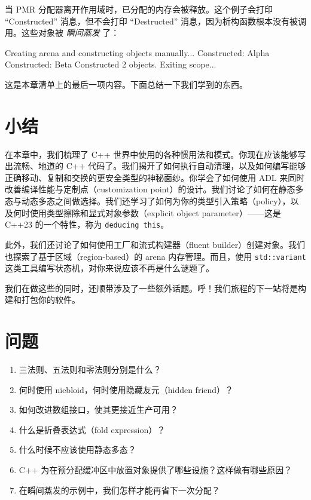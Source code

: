\label{idx:631}
\label{idx:632}
当 PMR 分配器离开作用域时，已分配的内存会被释放。这个例子会打印 “Constructed” 消息，但不会打印 “Destructed” 消息，因为析构函数根本没有被调用。这些对象被 \emph{瞬间蒸发} 了：

\begin{codebox}[text]
Creating arena and constructing objects manually...
Constructed: Alpha
Constructed: Beta
Constructed 2 objects. Exiting scope...
\end{codebox}

这是本章清单上的最后一项内容。下面总结一下我们学到的东西。

\section{小结}

在本章中，我们梳理了 C++ 世界中使用的各种惯用法和模式。你现在应该能够写出流畅、地道的 C++ 代码了。我们揭开了如何执行自动清理，以及如何编写能够正确移动、复制和交换的更安全类型的神秘面纱。你学会了如何使用 ADL 来同时改善编译性能与定制点（customization point）的设计。我们讨论了如何在静态多态与动态多态之间做选择。我们还学习了如何为你的类型引入策略（policy），以及何时使用类型擦除和显式对象参数（explicit object parameter）——这是 C++23 的一个特性，称为 \texttt{deducing this}。

此外，我们还讨论了如何使用工厂和流式构建器（fluent builder）创建对象。我们也探索了基于区域（region-based）的 arena 内存管理。而且，使用 \texttt{std::\allowbreak{}variant} 这类工具编写状态机，对你来说应该不再是什么谜题了。

我们在做这些的同时，还顺带涉及了一些额外话题。呼！我们旅程的下一站将是构建和打包你的软件。

\section{问题}

\begin{enumerate}
\item 三法则、五法则和零法则分别是什么？
\item 何时使用 niebloid，何时使用隐藏友元（hidden friend）？
\item 如何改进数组接口，使其更接近生产可用？
\item 什么是折叠表达式（fold expression）？
\item 什么时候不应该使用静态多态？
\item C++ 为在预分配缓冲区中放置对象提供了哪些设施？这样做有哪些原因？
\item 在瞬间蒸发的示例中，我们怎样才能再省下一次分配？
\end{enumerate}


